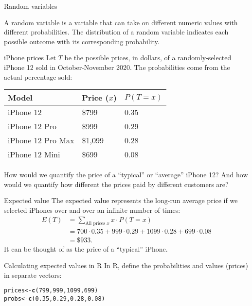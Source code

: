 \documentclass{beamer}\usepackage[]{graphicx}\usepackage[]{color}
\makeatletter
\newcommand{\hlnum}[1]{\textcolor[rgb]{0.686,0.059,0.569}{#1}}%
\newcommand{\hlstd}[1]{\textcolor[rgb]{0.345,0.345,0.345}{#1}}%
\newcommand{\hlkwb}[1]{\textcolor[rgb]{0.69,0.353,0.396}{#1}}%
\newcommand{\hlkwd}[1]{\textcolor[rgb]{0.737,0.353,0.396}{\textbf{#1}}}%
\newenvironment{kframe}{%
 \def\at@end@of@kframe{}%
 \ifinner\ifhmode%
  \def\at@end@of@kframe{\end{minipage}}%
  \begin{minipage}{\columnwidth}%
 \fi\fi%
 \def\FrameCommand##1{\hskip\@totalleftmargin \hskip-\fboxsep
 \colorbox{shadecolor}{##1}\hskip-\fboxsep
     \hskip-\linewidth \hskip-\@totalleftmargin \hskip\columnwidth}%
 \MakeFramed {\advance\hsize-\width
   \@totalleftmargin\z@ \linewidth\hsize
   \@setminipage}}%
 {\par\unskip\endMakeFramed%
 \at@end@of@kframe}
\newenvironment{knitrout}{}{} %
\makeatother
\begin{document}
\begin{darkframes}
\begin{frame}{Random variables}
  \begin{definition}
    A \alert{random variable} is a variable that can take on different numeric values with different probabilities. 
    The \alert{distribution} of a random variable indicates each possible outcome with its corresponding probability.
  \end{definition}
\end{frame}

\begin{frame}{iPhone prices}
  Let $T$ be the possible prices, in dollars, of a randomly-selected iPhone 12 sold in October-November 2020.
  The probabilities come from the actual percentage sold: 

  \begin{center}
    \begin{tabular}{lll}
      Model & Price ($x$) & $P(T=x)$ \\
      \hline
      iPhone 12 & \$799 & 0.35 \\
      iPhone 12 Pro & \$999 & 0.29 \\
      iPhone 12 Pro Max & \$1,099 & 0.28 \\
      iPhone 12 Mini & \$699 & 0.08 \\
    \end{tabular}
  \end{center}

  \pause
  How would we quantify the price of a ``typical'' or ``average'' iPhone 12? And how would we quantify how different the prices paid by different customers are?
\end{frame}

\begin{frame}{Expected value}
  The expected value represents the long-run average price if we selected iPhones over and over an infinite number of times:
  \begin{align*}
    E(T) &= \sum_{\text{All prices $x$}} x \cdot P(T = x) \\
    &= 700 \cdot 0.35 + 999 \cdot 0.29 + 1099 \cdot 0.28 + 699 \cdot 0.08 \\
    &= \$933.
  \end{align*}
  It can be thought of as the price of a ``typical'' iPhone.
\end{frame}

\begin{frame}[fragile]{Calculating expected values in R}
  In R, define the probabilities and values (prices) in separate vectors:
\begin{knitrout}
\color{fgcolor}\begin{kframe}
\begin{alltt}
\hlstd{prices} \hlkwb{<-} \hlkwd{c}\hlstd{(}\hlnum{799}\hlstd{,} \hlnum{999}\hlstd{,} \hlnum{1099}\hlstd{,} \hlnum{699}\hlstd{)}
\hlstd{probs} \hlkwb{<-} \hlkwd{c}\hlstd{(}\hlnum{0.35}\hlstd{,} \hlnum{0.29}\hlstd{,} \hlnum{0.28}\hlstd{,} \hlnum{0.08}\hlstd{)}


\end{alltt}
\end{kframe}
\end{knitrout}
\end{frame}
\end{darkframes}
\end{document}
